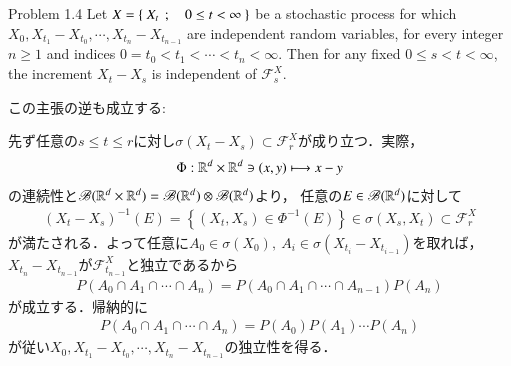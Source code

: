 \begin{itembox}[l]{Problem 1.4}
\label{thm:application_dynkin_system_theorem_to_independence}
		Let $X = \left\{\ X_t\ \, ; \quad 0 \leq t < \infty\ \right\}$ be a stochastic process 
		for which $X_0,X_{t_1} - X_{t_0}, \cdots, X_{t_n} - X_{t_{n-1}}$ are 
		independent random variables, for every integer $n \geq 1$ and indices 
		$0 = t_0 < t_1 < \cdots < t_n < \infty$. Then for any fixed $0 \leq s < t < \infty$, 
		the increment $X_t - X_s$ is independent of $\mathscr{F}^X_s$.
\end{itembox}
この主張の逆も成立する:
\begin{prf}
	先ず任意の$s \leq t \leq r$に対し$\sigma(X_t - X_s) \subset \mathscr{F}^X_r$が成り立つ．実際，
	\begin{align}
		\Phi:\mathbb{R}^d \times \mathbb{R}^d \ni (x,y) \longmapsto x - y
	\end{align}
	の連続性と$\mathscr{B}(\mathbb{R}^d \times \mathbb{R}^d) = \mathscr{B}(\mathbb{R}^d) \otimes \mathscr{B}(\mathbb{R}^d)$より，
	任意の$E \in \mathscr{B}(\mathbb{R}^d)$に対して
	\begin{align}
		(X_t - X_s)^{-1}(E) 
		= \left\{ \left( X_t,X_s \right) \in \Phi^{-1}(E) \right\}
		\in \sigma(X_s,X_t) \subset \mathscr{F}^X_r
		\label{eq:thm_application_dynkin_system_theorem_to_independence_1}
	\end{align}
	が満たされる．よって任意に$A_0 \in \sigma(X_0),\ A_i \in \sigma(X_{t_i} - X_{t_{i-1}})$を取れば，
	$X_{t_n} - X_{t_{n-1}}$が$\mathscr{F}^X_{t_{n-1}}$と独立であるから
	\begin{align}
		P(A_0 \cap A_1 \cap \cdots \cap A_n)
		= P(A_0 \cap A_1 \cap \cdots \cap A_{n-1}) P(A_n)
	\end{align}
	が成立する．帰納的に
	\begin{align}
		P(A_0 \cap A_1 \cap \cdots \cap A_n)
		= P(A_0) P(A_1) \cdots P(A_n)
	\end{align}
	が従い$X_0,X_{t_1} - X_{t_0}, \cdots, X_{t_n} - X_{t_{n-1}}$の独立性を得る．
	\QED
\end{prf}

